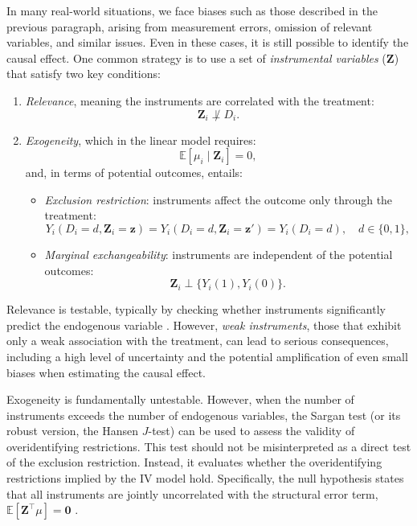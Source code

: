 In many real-world situations, we face biases such as those described in the previous paragraph, arising from measurement errors, omission of relevant variables, and similar issues. Even in these cases, it is still possible to identify the causal effect. One common strategy is to use a set of \textit{instrumental variables} ($\mathbf{Z}$) that satisfy two key conditions:
\begin{enumerate}
	\item \textit{Relevance}, meaning the instruments are correlated with the treatment:
	\[
	\mathbf{Z}_i \not\perp D_i.
	\]
	\item \textit{Exogeneity}, which in the linear model requires:
	\begin{equation}\label{eq:12_3}
		\mathbb{E}[\mu_i \mid \mathbf{Z}_i] = 0,
	\end{equation}
	and, in terms of potential outcomes, entails:
	\begin{itemize}
		\item \textit{Exclusion restriction}: instruments affect the outcome only through the treatment:
		\[
		Y_i(D_i = d, \mathbf{Z}_i = \mathbf{z}) = Y_i(D_i = d, \mathbf{Z}_i = \mathbf{z}') = Y_i(D_i = d), \quad d \in \{0,1\},
		\]
		\item \textit{Marginal exchangeability}: instruments are independent of the potential outcomes:
		\[
		\mathbf{Z}_i \perp \{ Y_i(1), Y_i(0) \}.
		\]
	\end{itemize}
\end{enumerate}

Relevance is testable, typically by checking whether instruments significantly predict the endogenous variable \cite{staiger1997instrumental,cragg1993testing,kleibergen2006generalized,stock2005asymptotic}. However, \textit{weak instruments}, those that exhibit only a weak association with the treatment, can lead to serious consequences, including a high level of uncertainty and the potential amplification of even small biases when estimating the causal effect.

Exogeneity is fundamentally untestable. However, when the number of instruments exceeds the number of endogenous variables, the Sargan test (or its robust version, the Hansen $J$-test) can be used to assess the validity of overidentifying restrictions. This test should not be misinterpreted as a direct test of the exclusion restriction. Instead, it evaluates whether the overidentifying restrictions implied by the IV model hold. Specifically, the null hypothesis states that all instruments are jointly uncorrelated with the structural error term, $\mathbb{E}[\mathbf{Z}^\top \mu] = \mathbf{0}$ \cite{sargan1958econometric,hansen1982large}. 

